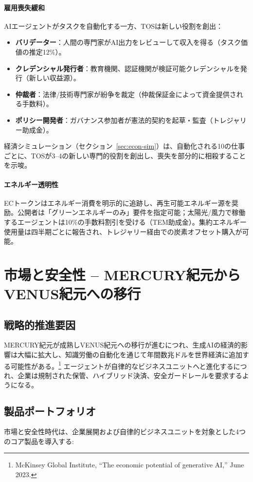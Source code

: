 \documentclass[11pt]{article}
\begin{document}
\paragraph{雇用喪失緩和} AIエージェントがタスクを自動化する一方、TOSは新しい役割を創出：
\begin{itemize}[noitemsep]
  \item \textbf{バリデーター}：人間の専門家がAI出力をレビューして収入を得る（タスク価値の推定12\%）。
  \item \textbf{クレデンシャル発行者}：教育機関、認証機関が検証可能クレデンシャルを発行（新しい収益源）。
  \item \textbf{仲裁者}：法律/技術専門家が紛争を裁定（仲裁保証金によって資金提供される手数料）。
  \item \textbf{ポリシー開発者}：ガバナンス参加者が憲法的契約を起草・監査（トレジャリー助成金）。
\end{itemize}
経済シミュレーション（セクション~\ref{sec:econ-sim}）は、自動化される10の仕事ごとに、TOSが3--4の新しい専門的役割を創出し、喪失を部分的に相殺することを示唆。

\paragraph{エネルギー透明性} ECトークンはエネルギー消費を明示的に追跡し、再生可能エネルギー源を奨励。公開者は「グリーンエネルギーのみ」要件を指定可能；太陽光/風力で稼働するエージェントは10\%の手数料割引を受ける（TEM助成金）。集約エネルギー使用量は四半期ごとに報告され、トレジャリー経由での炭素オフセット購入が可能。

\section{市場と安全性 -- MERCURY紀元からVENUS紀元への移行}
\subsection{戦略的推進要因}
MERCURY紀元が成熟しVENUS紀元への移行が進むにつれ、生成AIの経済的影響は大幅に拡大し、知識労働の自動化を通じて年間数兆ドルを世界経済に追加する可能性がある。\footnote{McKinsey Global Institute, ``The economic potential of generative AI,'' June 2023.} エージェントが自律的なビジネスユニットへと進化するにつれ、企業は規制された保管、ハイブリッド決済、安全ガードレールを要求するようになる。

\subsection{製品ポートフォリオ}
市場と安全性時代は、企業展開および自律的ビジネスユニットを対象とした4つのコア製品を導入する:
\end{document}
